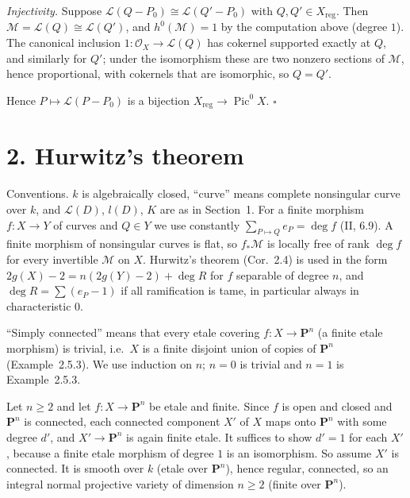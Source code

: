 \documentclass[11pt]{article}
\begin{document}
\emph{Injectivity.} Suppose $\mathcal L(Q-P_0)\cong\mathcal L(Q'-P_0)$ with $Q,Q'\in X_{\mathrm{reg}}$. Then $\mathcal M=\mathcal L(Q)\cong\mathcal L(Q')$, and $h^0(\mathcal M)=1$ by the computation above (degree $1$). The canonical inclusion $1:\mathcal O_X\to\mathcal L(Q)$ has cokernel supported exactly at $Q$, and similarly for $Q'$; under the isomorphism these are two nonzero sections of $\mathcal M$, hence proportional, with cokernels that are isomorphic, so $Q=Q'$.

Hence $P\mapsto\mathcal L(P-P_0)$ is a bijection $X_{\mathrm{reg}}\to\operatorname{Pic}^0X$. \hfill$\square$

\section*{2. Hurwitz's theorem}

Conventions. $k$ is algebraically closed, ``curve'' means complete nonsingular curve over $k$, and $\mathcal L(D)$, $l(D)$, $K$ are as in Section~1. For a finite morphism $f:X\to Y$ of curves and $Q\in Y$ we use constantly $\sum_{P\mapsto Q}e_P=\deg f$ (II, 6.9). A finite morphism of nonsingular curves is flat, so $f_*\mathcal M$ is locally free of rank $\deg f$ for every invertible $\mathcal M$ on $X$. Hurwitz's theorem (Cor.~2.4) is used in the form $2g(X)-2=n(2g(Y)-2)+\deg R$ for $f$ separable of degree $n$, and $\deg R=\sum(e_P-1)$ if all ramification is tame, in particular always in characteristic $0$.

\pf
``Simply connected'' means that every etale covering $f:X\to\mathbf P^n$ (a finite etale morphism) is trivial, i.e.\ $X$ is a finite disjoint union of copies of $\mathbf P^n$ (Example~2.5.3). We use induction on $n$; $n=0$ is trivial and $n=1$ is Example~2.5.3.

Let $n\ge2$ and let $f:X\to\mathbf P^n$ be etale and finite. Since $f$ is open and closed and $\mathbf P^n$ is connected, each connected component $X'$ of $X$ maps onto $\mathbf P^n$ with some degree $d'$, and $X'\to\mathbf P^n$ is again finite etale. It suffices to show $d'=1$ for each $X'$, because a finite etale morphism of degree $1$ is an isomorphism. So assume $X'$ is connected. It is smooth over $k$ (etale over $\mathbf P^n$), hence regular, connected, so an integral normal projective variety of dimension $n\ge2$ (finite over $\mathbf P^n$).
\end{document}
